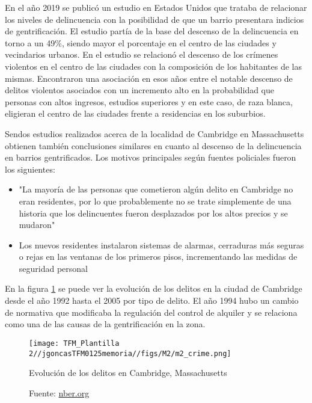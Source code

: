 \documentclass[12pt,a4paper,twoside]{book}
\begin{document}
En el año 2019 se publicó un estudio \cite{ellen_has_2019} en Estados Unidos que trataba de relacionar los niveles de delincuencia con la posibilidad de que un barrio presentara indicios de gentrificación. El estudio partía de la base del descenso de la delincuencia en torno a un 49\%, siendo mayor el porcentaje en el centro de las ciudades y vecindarios urbanos. En el estudio se relacionó el descenso de los crímenes violentos en el centro de las ciudades con la composición  de los habitantes de las mismas. Encontraron una asociación en esos años entre el notable descenso de delitos violentos asociados con un incremento alto en la probabilidad que personas con altos ingresos, estudios superiores y en este caso, de raza blanca, eligieran el centro de las ciudades frente a residencias en los suburbios.

Sendos estudios realizados acerca de la localidad de Cambridge en Massachusetts \cite{linke_new_2017} \cite{autor_gentrification_2017} obtienen también conclusiones similares en cuanto al descenso de la delincuencia en barrios gentrificados. Los motivos principales según fuentes policiales fueron los siguientes:
\begin{itemize}
    \item "La mayoría de las personas que cometieron algún delito en Cambridge no eran residentes, por lo que probablemente no se trate simplemente de una historia que los delincuentes fueron desplazados por los altos precios y se mudaron"
    \item Los nuevos residentes instalaron sistemas de alarmas, cerraduras más seguras o rejas en las ventanas de los primeros pisos, incrementando las medidas de seguridad personal
\end{itemize}

En la figura \ref{fig:fig_crimenes_cambridge} se puede ver la evolución de los delitos en la ciudad de Cambridge desde el año 1992 hasta el 2005 por tipo de delito. El año 1994 hubo un cambio de normativa que modificaba la regulación del control de alquiler y se relaciona como una de las causas de la gentrificación en la zona.

\begin{figure}
    \centering
    \texttt{[image: TFM\_Plantilla 2//jgoncasTFM0125memoria//figs/M2/m2\_crime.png]}
    \caption{Evolución de los delitos en Cambridge, Massachusetts}
    \caption*{Fuente: \href{https://www.nber.org/system/files/working_papers/w23914/w23914.pdf}{nber.org}}
    \label{fig:fig_crimenes_cambridge}
\end{figure}
\end{document}

